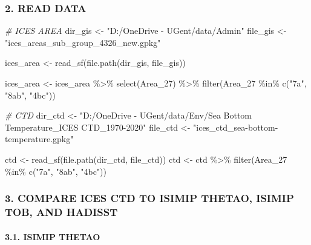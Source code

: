 \documentclass[
]{article}
\newenvironment{Shaded}{\begin{snugshade}}{\end{snugshade}}
\newcommand{\CommentTok}[1]{\textcolor[rgb]{0.56,0.35,0.01}{\textit{#1}}}
\newcommand{\FunctionTok}[1]{\textcolor[rgb]{0.00,0.00,0.00}{#1}}
\newcommand{\NormalTok}[1]{#1}
\newcommand{\OtherTok}[1]{\textcolor[rgb]{0.56,0.35,0.01}{#1}}
\newcommand{\SpecialCharTok}[1]{\textcolor[rgb]{0.00,0.00,0.00}{#1}}
\newcommand{\StringTok}[1]{\textcolor[rgb]{0.31,0.60,0.02}{#1}}
\begin{document}
\hypertarget{read-data}{%
\subsubsection{2. READ DATA}\label{read-data}}

\begin{Shaded}
\begin{Highlighting}[]
\CommentTok{\# ICES AREA}
\NormalTok{dir\_gis }\OtherTok{\textless{}{-}} \StringTok{"D:/OneDrive {-} UGent/data/Admin"}
\NormalTok{file\_gis }\OtherTok{\textless{}{-}} \StringTok{"ices\_areas\_sub\_group\_4326\_new.gpkg"}

\NormalTok{ices\_area }\OtherTok{\textless{}{-}} \FunctionTok{read\_sf}\NormalTok{(}\FunctionTok{file.path}\NormalTok{(dir\_gis, file\_gis))}

\NormalTok{ices\_area }\OtherTok{\textless{}{-}}\NormalTok{ ices\_area }\SpecialCharTok{\%\textgreater{}\%} \FunctionTok{select}\NormalTok{(Area\_27) }\SpecialCharTok{\%\textgreater{}\%} \FunctionTok{filter}\NormalTok{(Area\_27 }\SpecialCharTok{\%in\%} \FunctionTok{c}\NormalTok{(}\StringTok{"7a"}\NormalTok{, }\StringTok{"8ab"}\NormalTok{, }\StringTok{"4bc"}\NormalTok{))}

\CommentTok{\# CTD}
\NormalTok{dir\_ctd }\OtherTok{\textless{}{-}} \StringTok{"D:/OneDrive {-} UGent/data/Env/Sea Bottom Temperature\_ICES CTD\_1970{-}2020"}
\NormalTok{file\_ctd }\OtherTok{\textless{}{-}} \StringTok{"ices\_ctd\_sea{-}bottom{-}temperature.gpkg"}

\NormalTok{ctd }\OtherTok{\textless{}{-}} \FunctionTok{read\_sf}\NormalTok{(}\FunctionTok{file.path}\NormalTok{(dir\_ctd, file\_ctd))}
\NormalTok{ctd }\OtherTok{\textless{}{-}}\NormalTok{ ctd }\SpecialCharTok{\%\textgreater{}\%} \FunctionTok{filter}\NormalTok{(Area\_27 }\SpecialCharTok{\%in\%} \FunctionTok{c}\NormalTok{(}\StringTok{"7a"}\NormalTok{, }\StringTok{"8ab"}\NormalTok{, }\StringTok{"4bc"}\NormalTok{))}
\end{Highlighting}
\end{Shaded}

\hypertarget{compare-ices-ctd-to-isimip-thetao-isimip-tob-and-hadisst}{%
\subsubsection{3. COMPARE ICES CTD TO ISIMIP THETAO, ISIMIP TOB, AND
HADISST}\label{compare-ices-ctd-to-isimip-thetao-isimip-tob-and-hadisst}}

\hypertarget{isimip-thetao}{%
\paragraph{3.1. ISIMIP THETAO}\label{isimip-thetao}}
\end{document}
